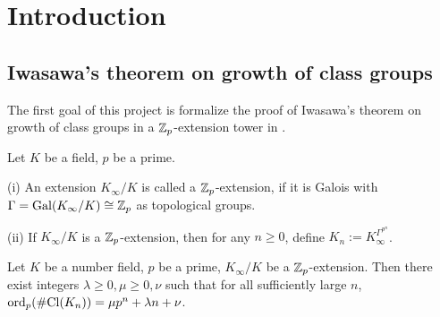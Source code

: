 %

\tableofcontents

\section{Introduction}

\subsection{Iwasawa's theorem on growth of class groups}

The first goal of this project is formalize the proof of
Iwasawa's theorem on growth of class groups in a ${\mathbb {Z}}_p$-extension tower
in {\Lean}.

\begin{definition}
\label{Zp-ext-def}
\leanok
Let $K$ be a field, $p$ be a prime.

{\rm(i)} An extension $K_\infty/K$ is called a ${\mathbb {Z}}_p$-extension,
if it is Galois with $\Gamma={\mathrm{Gal}}(K_\infty/K)\cong{\mathbb {Z}}_p$
as topological groups.

{\rm(ii)} If $K_\infty/K$ is a ${\mathbb {Z}}_p$-extension, then for any
$n\geq 0$, define $K_n:=K_\infty^{\Gamma^{p^n}}$.
\end{definition}

\begin{thm}
\label{clgp-growth}
\leanok
Let $K$ be a number field, $p$ be a prime,
$K_\infty/K$ be a ${\mathbb {Z}}_p$-extension.
Then there exist integers $\lambda\geq 0,\mu\geq 0,\nu$
such that for all sufficiently large $n$,
$\operatorname{ord}_p(\#{\mathrm{Cl}}(K_n))=\mu p^n+\lambda n+\nu$.
\end{thm}

